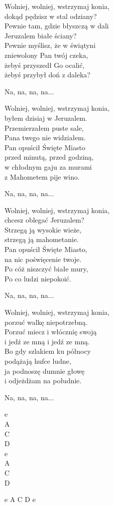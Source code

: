 \begin{text}
    Wolniej, wolniej, wstrzymaj konia,\\
    dokąd pędzisz w stal odziany?\\
    Pewnie tam, gdzie błyszczą w dali\\
    Jeruzalem białe ściany?\\
    Pewnie myślisz, że w świątyni\\
    zniewolony Pan twój czeka,\\
    żebyś przyszedł Go ocalić,\\
    żebyś przybył doń z daleka?

    \vin Na, na, na, na...

    Wolniej, wolniej, wstrzymaj konia,\\
    byłem dzisiaj w Jeruzalem.\\
    Przemierzałem puste sale,\\
    Pana twego nie widziałem.\\
    Pan opuścił Święte Miasto\\
    przed minutą, przed godziną,\\
    w chłodnym gaju za murami\\
    z Mahometem pije wino.
        
    \vin Na, na, na, na...

    Wolniej, wolniej, wstrzymaj konia,\\
    chcesz oblegać Jeruzalem?\\
    Strzegą ją wysokie wieże,\\
    strzegą ją mahometanie.\\
    Pan opuścił Święte Miasto,\\
    na nic poświęcenie twoje.\\
    Po cóż niszczyć białe mury,\\
    Po co ludzi niepokoić.
    
    \vin Na, na, na, na...

    Wolniej, wolniej, wstrzymaj konia,\\
    porzuć walkę niepotrzebną.\\
    Porzuć miecz i włócznię swoją\\
    i jedź ze mną i jedź ze mną.\\
    Bo gdy szlakiem ku północy\\
    podążają hufce ludne,\\
    ja podnoszę dumnie głowę\\
    i odjeżdżam na południe.

    \vin Na, na, na, na...    
\end{text}
\begin{chord}
    e\\
    A\\
    C\\
    D\\
    e\\
    A\\
    C\\
    D

    e A C D e
\end{chord}
